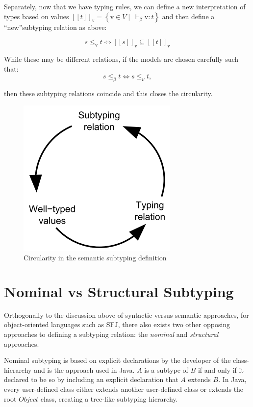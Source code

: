 \documentclass{l4proj}
\begin{document}
Separately, now that we have typing rules, we can define a new interpretation of types based on values $[\![t]\!]_{\mathrm{v}} = \left\{\mathrm{v} \in V \mid \: \vdash_{\beta} \mathrm{v} : t \right\}$ and then define a ``new''subtyping relation as above:

\begin{equation*}
    s \leq_{\mathrm{v}} t \iff [\![s]\!]_{\mathrm{v}} \subseteq [\![t]\!]_{\mathrm{v}}
\end{equation*}

While these may be different relations, if the models are chosen carefully such that:
\begin{equation*}
    s \leq_{\beta} t \iff s \leq_{\nu} t,
\end{equation*}

then these subtyping relations coincide and this closes the circularity.

\begin{figure}
    \centering
    \includegraphics[width=0.4\linewidth]{images/circularity.PNG}
    \caption{Circularity in the semantic subtyping definition \citep{Castagna2005}}
    \label{fig:circ}
\end{figure}

\section{Nominal vs Structural Subtyping}

Orthogonally to the discussion above of syntactic versus semantic approaches, for object-oriented languages such as SFJ, there also exists two other opposing approaches to defining a subtyping relation: the \emph{nominal} and \emph{structural} approaches.

Nominal subtyping is based on explicit declarations by the developer of the class-hierarchy and is the approach used in Java. $A$ is a subtype of $B$ if and only if it declared to be so by including an explicit declaration that $A$ extends $B$. In Java, every user-defined class either extends another user-defined class or extends the root $Object$ class, creating a tree-like subtyping hierarchy.
\end{document}
